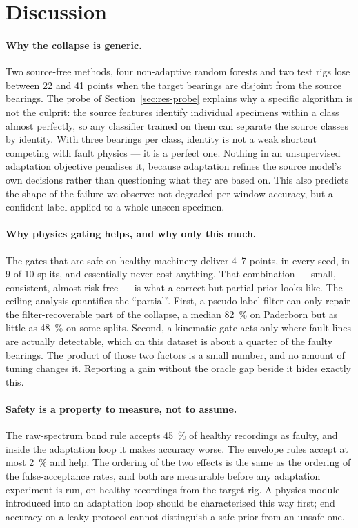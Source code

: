 \section{Discussion}
\label{sec:discussion}

\paragraph{Why the collapse is generic.} Two source-free methods, four non-adaptive random forests and two test rigs lose
between 22 and 41 points when the target bearings are disjoint from the source bearings. The probe of
Section~\ref{sec:res-probe} explains why a specific algorithm is not the culprit: the source features identify individual
specimens within a class almost perfectly, so any classifier trained on them can separate the source classes by identity.
With three bearings per class, identity is not a weak shortcut competing with fault physics --- it is a perfect one. Nothing
in an unsupervised adaptation objective penalises it, because adaptation refines the source model's own decisions rather
than questioning what they are based on. This also predicts the shape of the failure we observe: not degraded per-window
accuracy, but a confident label applied to a whole unseen specimen.

\paragraph{Why physics gating helps, and why only this much.} The gates that are safe on healthy machinery deliver 4--7
points, in every seed, in 9 of 10 splits, and essentially never cost anything. That combination --- small, consistent,
almost risk-free --- is what a correct but partial prior looks like. The ceiling analysis quantifies the ``partial''. First,
a pseudo-label filter can only repair the filter-recoverable part of the collapse, a median \SI{82}{\percent} on Paderborn
but as little as \SI{48}{\percent} on some splits. Second, a kinematic gate acts only where fault lines are actually
detectable, which on this dataset is about a quarter of the faulty bearings. The product of those two factors is a small
number, and no amount of tuning changes it. Reporting a gain without the oracle gap beside it hides exactly this.

\paragraph{Safety is a property to measure, not to assume.} The raw-spectrum band rule accepts \SI{45}{\percent} of healthy
recordings as faulty, and inside the adaptation loop it makes accuracy worse. The envelope rules accept at most
\SI{2}{\percent} and help. The ordering of the two effects is the same as the ordering of the false-acceptance rates, and
both are measurable before any adaptation experiment is run, on healthy recordings from the target rig. A physics module
introduced into an adaptation loop should be characterised this way first; end accuracy on a leaky protocol cannot
distinguish a safe prior from an unsafe one.

